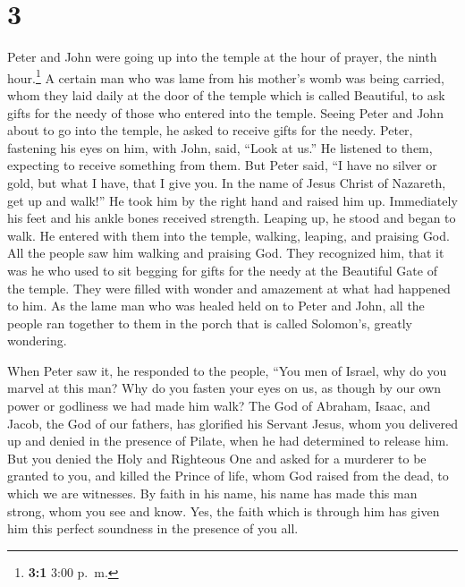 \hypertarget{section-2}{%
\section{3}\label{section-2}}

 Peter and John were going up into the temple at the hour
of prayer, the ninth hour.\footnote{\textbf{3:1} 3:00 p.~m.}
 A certain man who was lame from his mother's womb was
being carried, whom they laid daily at the door of the temple which is
called Beautiful, to ask gifts for the needy of those who entered into
the temple.  Seeing Peter and John about to go into the
temple, he asked to receive gifts for the needy.  Peter,
fastening his eyes on him, with John, said, ``Look at us.''
 He listened to them, expecting to receive something from
them.  But Peter said, ``I have no silver or gold, but
what I have, that I give you. In the name of Jesus Christ of Nazareth,
get up and walk!''  He took him by the right hand and
raised him up. Immediately his feet and his ankle bones received
strength.  Leaping up, he stood and began to walk. He
entered with them into the temple, walking, leaping, and praising God.
 All the people saw him walking and praising God.
 They recognized him, that it was he who used to sit
begging for gifts for the needy at the Beautiful Gate of the temple.
They were filled with wonder and amazement at what had happened to him.
 As the lame man who was healed held on to Peter and
John, all the people ran together to them in the porch that is called
Solomon's, greatly wondering.

 When Peter saw it, he responded to the people, ``You men
of Israel, why do you marvel at this man? Why do you fasten your eyes on
us, as though by our own power or godliness we had made him walk?
 The God of Abraham, Isaac, and Jacob, the God of our
fathers, has glorified his Servant Jesus, whom you delivered up and
denied in the presence of Pilate, when he had determined to release him.
 But you denied the Holy and Righteous One and asked for
a murderer to be granted to you,  and killed the Prince
of life, whom God raised from the dead, to which we are witnesses.
 By faith in his name, his name has made this man strong,
whom you see and know. Yes, the faith which is through him has given him
this perfect soundness in the presence of you all.


